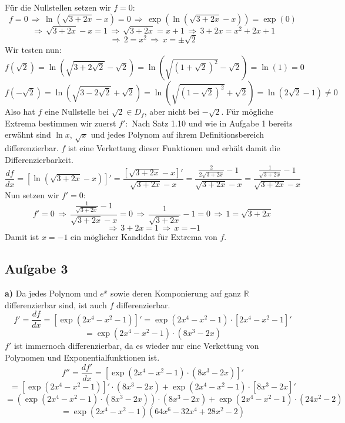 \documentclass[a4paper,graphics,11pt]{article}
\newcommand{\aufgabe}[1]{\subsection*{Aufgabe #1}}
\begin{document}
Für die Nullstellen setzen wir $f = 0$:
$$
    f = 0 \,\Longrightarrow\, \ln\left(\sqrt{3+2x}-x\right) = 0
    \,\Longrightarrow\, \exp\left(\ln\left(\sqrt{3+2x}-x\right)\right) = \exp(0)
$$$$
    \,\Longrightarrow\, \sqrt{3+2x} -x = 1 \,\Longrightarrow\, \sqrt{3+2x} = x+1
    \,\Longrightarrow\, 3+2x = x^2+2x+1
$$$$
    \,\Longrightarrow\, 2 = x^2 \,\Longrightarrow\, x = \pm\sqrt{2}
$$
Wir testen nun:
$$
    f(\sqrt{2}) = \ln\left(\sqrt{3+2\sqrt{2}}-\sqrt{2}\right)
    = \ln\left(\sqrt{(1+\sqrt{2})^2} -\sqrt{2}\right)
    = \ln(1) = 0
$$$$
    f(-\sqrt{2}) = \ln\left(\sqrt{3-2\sqrt{2}}+\sqrt{2}\right)
    = \ln\left(\sqrt{(1-\sqrt{2})^2} +\sqrt{2}\right)
    = \ln(2\sqrt{2}-1) \neq 0
$$
Also hat $f$ eine Nullstelle bei $\sqrt{2} \in D_f$, aber nicht bei $-\sqrt{2}$.
\newpage
Für mögliche Extrema bestimmen wir zuerst $f'\colon$
Nach Satz 1.10 und wie in Aufgabe 1 bereits erwähnt sind $\ln x$, $\sqrt{x}$ und jedes Polynom auf ihrem
Definitionsbereich differenzierbar. $f$ ist eine Verkettung dieser Funktionen und erhält damit die Differenzierbarkeit.
$$
    \frac{df}{dx} = \left[\ln\left(\sqrt{3+2x}-x\right)\right]'
    = \frac{\left[\sqrt{3+2x}-x\right]'}{\sqrt{3+2x} -x}
    = \frac{\frac{2}{2\sqrt{3+2x}}-1}{\sqrt{3+2x} -x}
    = \frac{\frac{1}{\sqrt{3+2x}}-1}{\sqrt{3+2x}-x}
$$
Nun setzen wir $f' = 0\colon$
$$
    f'=0 \,\Longrightarrow\, \frac{\frac{1}{\sqrt{3+2x}} -1}{\sqrt{3+2x} -x} = 0
    \,\Longrightarrow\, \frac{1}{\sqrt{3+2x}} -1 = 0
    \,\Longrightarrow\, 1 = \sqrt{3+2x}
$$$$
    \,\Longrightarrow\, 3+2x = 1
    \,\Longrightarrow\, x = -1
$$
Damit ist $x = -1$ ein möglicher Kandidat für Extrema von $f$.

\aufgabe{3}

\textbf{a)}
Da jedes Polynom und $e^x$ sowie deren Komponierung auf ganz $\mathbb{R}$ differenzierbar sind, ist auch $f$
differenzierbar.
$$
    f' = \frac{df}{dx} = \left[\exp(2x^4-x^2-1)\right]'
    = \exp(2x^4-x^2-1)\cdot \left[2x^4-x^2-1\right]'
$$$$
    = \exp(2x^4-x^2-1) \cdot (8x^3-2x)
$$
$f'$ ist immernoch differenzierbar, da es wieder nur eine Verkettung von Polynomen und Exponentialfunktionen ist.
$$
    f'' = \frac{df'}{dx} = \left[\exp(2x^4-x^2-1)\cdot (8x^3-2x)\right]'
$$$$
    = [\exp(2x^4-x^2-1)]'\cdot(8x^3-2x) + \exp(2x^4-x^2-1)\cdot[8x^3-2x]'
$$$$
    = \left(\exp(2x^4-x^2-1) \cdot (8x^3-2x)\right) \cdot(8x^3-2x) + \exp(2x^4-x^2-1)\cdot(24x^2-2)
$$$$
    = \exp(2x^4-x^2-1)(64x^6-32x^4+28x^2-2)
$$
\end{document}
